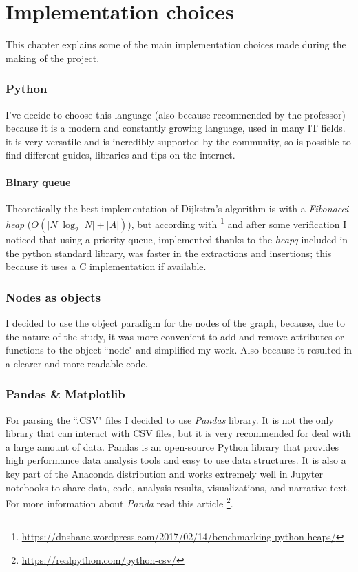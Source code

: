 \documentclass[a4paper,11pt]{report}
\begin{document}
\chapter{Implementation choices}
This chapter explains some of the main implementation choices made during the making of the project.
\subsection{Python}
I've decide to choose this language (also because recommended by the professor) because it is a modern and constantly growing language, used in many IT fields. it is very versatile and is incredibly supported by the community, so is possible to find different guides, libraries and tips on the internet.
\subsubsection{Binary queue}
Theoretically the best implementation of Dijkstra's algorithm is with a \textit{Fibonacci heap} ($O(|N|\log_2|N|+|A|)$), but according with \footnote{\url{https://dnshane.wordpress.com/2017/02/14/benchmarking-python-heaps/}} and after some verification I noticed that using a priority queue, implemented thanks to the \textit{heapq} included in the python standard library, was faster in the extractions and insertions; this because it uses a C implementation if available.

\subsection{Nodes as objects}
I decided to use the object paradigm for the nodes of the graph, because, due to the nature of the study, it was more convenient to add and remove attributes or functions to the object ``node" and simplified my work. Also because it resulted in a clearer and more readable code.
\subsection{Pandas \& Matplotlib}
For parsing the ``.CSV" files I decided to use \textit{Pandas} library. It is not the only library that can interact with CSV files, but it is very recommended for deal with a large amount of data.
Pandas is an open-source Python library that provides high performance data analysis tools and easy to use data structures. It is also a key part of the Anaconda distribution and works extremely well in Jupyter notebooks to share data, code, analysis results, visualizations, and narrative text. For more information about \textit{Panda} read this article \footnote{\url{https://realpython.com/python-csv/}}.
\vspace{5mm}
\end{document}
